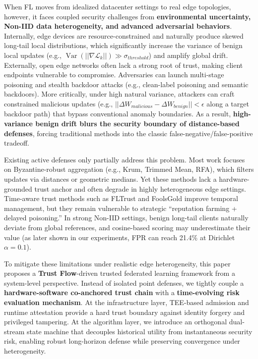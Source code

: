 \documentclass[runningheads]{llncs}
\begin{document}
When FL moves from idealized datacenter settings to real edge topologies, however, it faces coupled security challenges from \textbf{environmental uncertainty, Non-IID data heterogeneity, and advanced adversarial behaviors}. Internally, edge devices are resource-constrained and naturally produce skewed long-tail local distributions, which significantly increase the variance of benign local updates (e.g., $\operatorname{Var}(|| \nabla \mathcal{L}_k ||) \gg \sigma_{threshold}$) and amplify global drift. Externally, open edge networks often lack a strong root of trust, making client endpoints vulnerable to compromise. Adversaries can launch multi-stage poisoning and stealth backdoor attacks (e.g., clean-label poisoning and semantic backdoors)\cite{gu2017badnets,wang2019neuralcleanse}. More critically, under high natural variance, attackers can craft constrained malicious updates (e.g., $||\Delta W_{malicious} - \Delta W_{benign}|| < \epsilon$ along a target backdoor path) that bypass conventional anomaly boundaries. As a result, \textbf{high-variance benign drift blurs the security boundary of distance-based defenses}, forcing traditional methods into the classic false-negative/false-positive tradeoff.

Existing active defenses only partially address this problem. Most work focuses on Byzantine-robust aggregation (e.g., Krum, Trimmed Mean, RFA), which filters updates via distances or geometric medians\cite{blanchard2017krum,yin2018byzantine,pillutla2022robust}. Yet these methods lack a hardware-grounded trust anchor and often degrade in highly heterogeneous edge settings. Time-aware trust methods such as FLTrust and FoolsGold\cite{cao2021fltrust,fung2020foolsgold} improve temporal management, but they remain vulnerable to strategic ``reputation farming + delayed poisoning.'' In strong Non-IID settings, benign long-tail clients naturally deviate from global references, and cosine-based scoring may underestimate their value (as later shown in our experiments, FPR can reach 21.4\% at Dirichlet $\alpha=0.1$).

To mitigate these limitations under realistic edge heterogeneity, this paper proposes a \textbf{Trust Flow}-driven trusted federated learning framework from a system-level perspective. Instead of isolated point defenses, we tightly couple a \textbf{hardware-software co-anchored trust chain} with a \textbf{time-evolving risk evaluation mechanism}. At the infrastructure layer, TEE-based admission and runtime attestation provide a hard trust boundary against identity forgery and privileged tampering. At the algorithm layer, we introduce an orthogonal dual-stream state machine that decouples historical utility from instantaneous security risk, enabling robust long-horizon defense while preserving convergence under heterogeneity.
\end{document}
